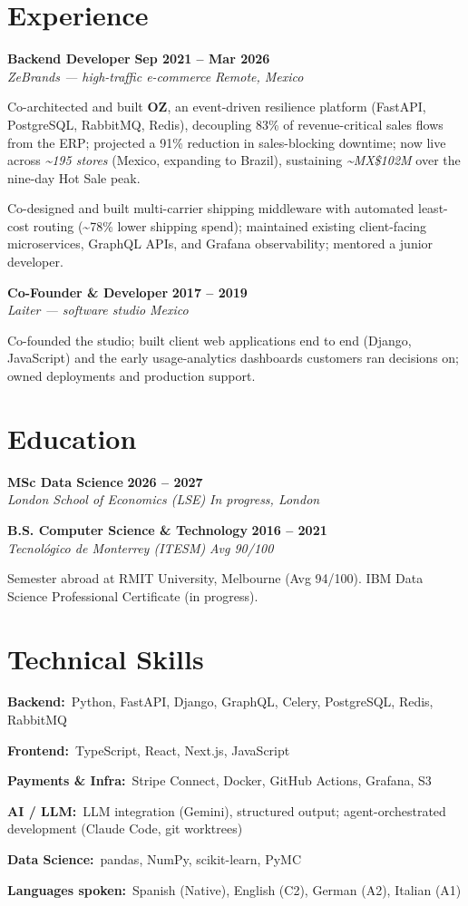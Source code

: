 \documentclass[10pt,a4paper]{article}
\newcommand{\role}[4]{%
  \textbf{#1} \hfill \textbf{#3}\\[1pt]
  {\color{soft}\textit{#2} \hfill \textit{#4}}\par\vspace{2pt}}
\newcommand{\skill}[2]{\textbf{\color{soft}#1:}\ #2\par\vspace{1.5pt}}
\begin{document}
\section*{Experience}
\role{Backend Developer}{ZeBrands — high-traffic e-commerce}{Sep 2021 -- Mar 2026}{Remote, Mexico}
\begin{tight}
  \item Co-architected and built \textbf{OZ}, an event-driven resilience platform (FastAPI, PostgreSQL, RabbitMQ, Redis), decoupling 83\% of revenue-critical sales flows from the ERP; projected a 91\% reduction in sales-blocking downtime; now live across \textit{\textasciitilde195 stores} (Mexico, expanding to Brazil), sustaining \textit{\textasciitilde MX\$102M} over the nine-day Hot Sale peak.
  \item Co-designed and built multi-carrier shipping middleware with automated least-cost routing (\textasciitilde78\% lower shipping spend); maintained existing client-facing microservices, GraphQL APIs, and Grafana observability; mentored a junior developer.
\end{tight}
\vspace{3pt}
\role{Co-Founder \& Developer}{Laiter — software studio}{2017 -- 2019}{Mexico}
\begin{tight}
  \item Co-founded the studio; built client web applications end to end (Django, JavaScript) and the early usage-analytics dashboards customers ran decisions on; owned deployments and production support.
\end{tight}

\section*{Education}
\role{MSc Data Science}{London School of Economics (LSE)}{2026 -- 2027}{In progress, London}
\vspace{2pt}
\role{B.S. Computer Science \& Technology}{Tecnológico de Monterrey (ITESM)}{2016 -- 2021}{Avg 90/100}
\vspace{1pt}
{\color{soft}\small Semester abroad at RMIT University, Melbourne (Avg 94/100). IBM Data Science Professional Certificate (in progress).}

\section*{Technical Skills}
\skill{Backend}{Python, FastAPI, Django, GraphQL, Celery, PostgreSQL, Redis, RabbitMQ}
\skill{Frontend}{TypeScript, React, Next.js, JavaScript}
\skill{Payments \& Infra}{Stripe Connect, Docker, GitHub Actions, Grafana, S3}
\skill{AI / LLM}{LLM integration (Gemini), structured output; agent-orchestrated development (Claude Code, git worktrees)}
\skill{Data Science}{pandas, NumPy, scikit-learn, PyMC}
\skill{Languages spoken}{Spanish (Native), English (C2), German (A2), Italian (A1)}
\end{document}
